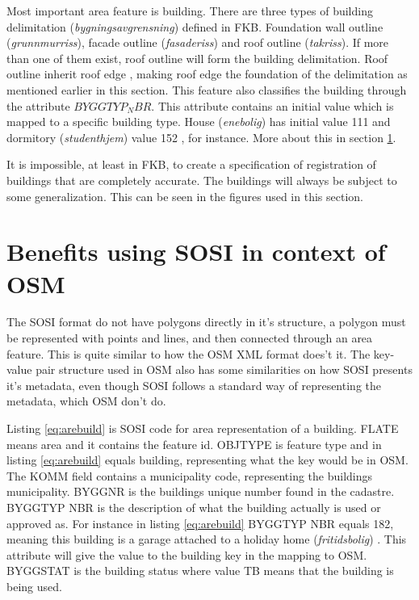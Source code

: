 Most important area feature is building. There are three types of building delimitation (\textit{bygningsavgrensning}) defined in FKB. Foundation wall outline (\textit{grunnmurriss}), facade outline (\textit{fasaderiss}) and roof outline (\textit{takriss}). If more than one of them exist, roof outline will form the building delimitation. Roof outline inherit roof edge \cite{SOSI-sekreteriatet}, making roof edge the foundation of the delimitation as mentioned earlier in this section. This feature also classifies the building through the attribute $BYGGTYP_NBR$. This attribute contains an initial value which is mapped to a specific building type. House (\textit{enebolig}) has initial value 111 and dormitory (\textit{studenthjem}) value 152 \cite{Kartverketd}, for instance. More about this in section \ref{sec:sosiosm}.

It is impossible, at least in FKB, to create a specification of registration of buildings that are completely accurate. The buildings will always be subject to some generalization. This can be seen in the figures used in this section. 

\section{Benefits using SOSI in context of OSM}\label{sec:sosiosm}
The SOSI format do not have polygons directly in it's structure, a polygon must be represented with points and lines, and then connected through an area feature. This is quite similar to how the OSM XML format does't it. The key-value pair structure used in OSM also has some similarities on how SOSI presents it's metadata, even though SOSI follows a standard way of representing the metadata, which OSM don't do. 

Listing \ref{eq:arebuild} is SOSI code for area representation of a building. FLATE means area and it contains the feature id. OBJTYPE is feature type and in listing \ref{eq:arebuild} equals building, representing what the key would be in OSM. The KOMM field contains a municipality code, representing the buildings municipality. BYGGNR is the buildings unique number found in the cadastre. BYGGTYP NBR is the description of what the building actually is used or approved as. For instance in listing \ref{eq:arebuild} BYGGTYP NBR equals 182, meaning this building is a garage attached to a holiday home (\textit{fritidsbolig}) \cite{SOSI-sekretariatet}. This attribute will give the value to the building key in the mapping to OSM. BYGGSTAT is the building status where value TB means that the building is being used. 

